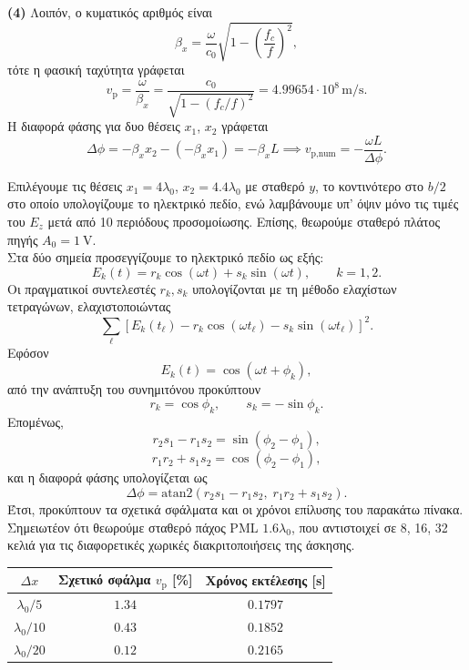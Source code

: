 \documentclass[12pt]{article}
\begin{document}
\textbf{(4)}
Λοιπόν, ο κυματικός αριθμός είναι
\[
\beta_x=\frac{\omega}{c_0}
\sqrt{1-\left(\frac{f_c}{f}\right)^2}
,\] τότε η φασική ταχύτητα γράφεται
\[
v_{\mathrm{p}}
=\frac{\omega}{\beta_x}
=\frac{c_0}{\sqrt{1-(f_c/f)^2}}
=4.99654\cdot 10^8\,\mathrm{m/s}.
\]
Η διαφορά φάσης για δυο θέσεις $x_1$, $x_2$ γράφεται
\[
\Delta \phi = -\beta_x x_2 -(-\beta_x x_1) = -\beta_x L \implies v_\text{p,num} = -\frac{\omega L}{\Delta \phi}
.\]

Επιλέγουμε τις θέσεις $x_1 = 4\lambda_0$, $x_2 = 4.4\lambda_0$ με σταθερό $y$, το κοντινότερο στο $b/2$ στο οποίο υπολογίζουμε το ηλεκτρικό πεδίο, ενώ λαμβάνουμε υπ' όψιν μόνο τις τιμές του $E_z$ μετά από 10 περιόδους προσομοίωσης. Επίσης, θεωρούμε σταθερό πλάτος πηγής $A_0 = \SI{1}{\volt}$.\\
Στα δύο σημεία προσεγγίζουμε το ηλεκτρικό πεδίο ως εξής:
\[
E_k(t) = r_k\cos(\omega t)+s_k\sin(\omega t),
\qquad k=1,2.
\]
Οι πραγματικοί συντελεστές \(r_k,s_k\) υπολογίζονται με τη μέθοδο ελαχίστων τετραγώνων, ελαχιστοποιώντας
\[
\sum_{\ell}
\left[
E_k(t_\ell)-r_k\cos(\omega t_\ell)
-s_k\sin(\omega t_\ell)
\right]^2.
\]
Εφόσον
\[
E_k(t)= \cos(\omega t+\phi_k),
\]
από την ανάπτυξη του συνημιτόνου προκύπτουν
\[
r_k=\cos\phi_k,\qquad
s_k=-\sin\phi_k.
\]
Επομένως,
\[
r_2s_1-r_1s_2=\sin(\phi_2-\phi_1),
\]
\[
r_1r_2+s_1s_2=\cos(\phi_2-\phi_1),
\]
και η διαφορά φάσης υπολογίζεται ως
\[
\Delta\phi=
\text{atan2}
\left(r_2s_1-r_1s_2,\;r_1r_2+s_1s_2\right).
\]
Έτσι, προκύπτουν τα σχετικά σφάλματα και οι χρόνοι επίλυσης του παρακάτω πίνακα. Σημειωτέον ότι θεωρούμε σταθερό πάχος PML $1.6\lambda_0$, που αντιστοιχεί σε 8, 16, 32 κελιά για τις διαφορετικές χωρικές διακριτοποιήσεις της άσκησης.
\begin{table}[htbp]
    \centering
    \begin{tabular}{c c c}
        \hline
        $\Delta x$ &
        Σχετικό σφάλμα $v_\text{p}$ [\%] &
        Χρόνος εκτέλεσης [s] \\
        \hline
        $\lambda_0/5$  & $1.34$ & $0.1797$ \\
        $\lambda_0/10$ & $0.43$ & $0.1852$ \\
        $\lambda_0/20$ & $0.12$ & $0.2165$ \\
        \hline
    \end{tabular}
\end{table}
\end{document}
